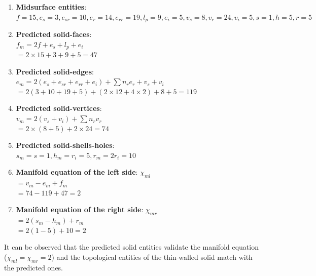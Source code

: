\begin{enumerate}
[noitemsep,topsep=2pt,parsep=2pt,partopsep=2pt]
\item \textbf{Midsurface entities}: \\$f = 15, e_s = 3, e_{sr} = 10, e_r = 14, e_{rr} = 19, l_p = 9 ,e_i=5,v_s = 8,v_r =24, v_i= 5, s=1,h=5,r=5$
\item \textbf{Predicted solid-faces}: \\$f_m = 2f+e_s+ l_p +e_i $\\$= 2 \times 15 + 3 + 9 + 5 = 47$
\item \textbf{Predicted solid-edges}: \\ $e_m = 2(e_s+e_{sr}+e_{rr}+e_i )+ \sum n_{r} e_{r}+v_s+v_i $\\$= 2(3+10+19 + 5)+ (2\times 12 + 4 \times 2)+8+5 = 119$
\item \textbf{Predicted solid-vertices}: \\$v_m = 2(v_s+ v_i) + \sum n_{r} v_r$\\$=2\times (8 + 5)  + 2 \times 24=74$
\item \textbf{Predicted solid-shells-holes}: \\$s_m =s = 1, h_m = r_i  = 5, r_m = 2r_i = 10$
\item \textbf{Manifold equation of the  left side}:  $\chi_{ml} $\\$= v_m-e_m+f_m $\\$=74-119+47= 2$
\item \textbf{Manifold equation of the  right side}:  $\chi_{mr}$\\$=2(s_m-h_m )+r_m$\\$= 2(1-5)+10 = 2$
\end{enumerate}
It can be observed that the predicted solid entities validate the manifold equation ($\chi_{ml} = \chi_{mr} = 2$) and the topological entities of the thin-walled solid match with the predicted ones.



